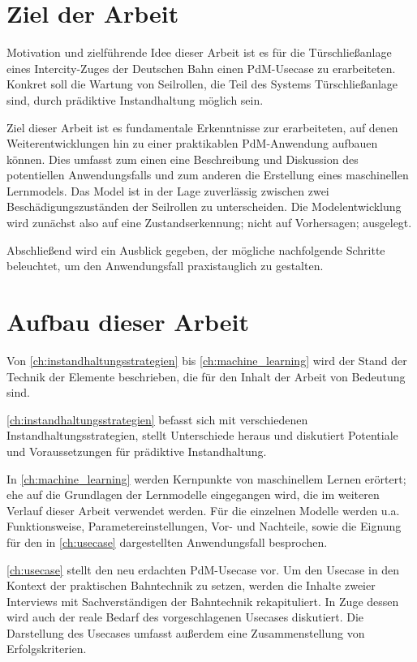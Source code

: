 \section{Ziel der Arbeit}
\label{sec:ziel}
Motivation und zielführende Idee dieser Arbeit ist es für die Türschließanlage eines Intercity-Zuges der Deutschen Bahn einen PdM-Usecase zu erarbeiteten. Konkret soll die Wartung von Seilrollen, die Teil des Systems Türschließanlage sind, durch prädiktive Instandhaltung möglich sein.

Ziel dieser Arbeit ist es fundamentale Erkenntnisse zur erarbeiteten, auf denen Weiterentwicklungen hin zu einer praktikablen PdM-Anwendung aufbauen können. Dies umfasst zum einen eine Beschreibung und Diskussion des potentiellen Anwendungsfalls und zum anderen die Erstellung eines maschinellen Lernmodels. Das Model ist in der Lage zuverlässig zwischen zwei Beschädigungszuständen der Seilrollen zu unterscheiden. Die Modelentwicklung wird zunächst also auf eine Zustandserkennung; nicht auf Vorhersagen; ausgelegt.

Abschließend wird ein Ausblick gegeben, der mögliche nachfolgende Schritte beleuchtet, um den Anwendungsfall praxistauglich zu gestalten.
\section{Aufbau dieser Arbeit}
\label{sec:aufbau_dieser_arbeit}
Von \cref{ch:instandhaltungsstrategien} bis \cref{ch:machine_learning} wird der Stand der Technik der Elemente beschrieben, die für den Inhalt der Arbeit von Bedeutung sind.

\cref{ch:instandhaltungsstrategien} befasst sich mit verschiedenen Instandhaltungsstrategien, stellt Unterschiede heraus und diskutiert Potentiale und Voraussetzungen für prädiktive Instandhaltung.

In \cref{ch:machine_learning} werden Kernpunkte von maschinellem Lernen erörtert; ehe auf die Grundlagen der Lernmodelle eingegangen wird, die im weiteren Verlauf dieser Arbeit verwendet werden. Für die einzelnen Modelle werden u.a. Funktionsweise, Parametereinstellungen, Vor- und Nachteile, sowie die Eignung für den in \cref{ch:usecase} dargestellten Anwendungsfall besprochen. 

\cref{ch:usecase} stellt den neu erdachten PdM-Usecase vor. Um den Usecase in den Kontext der praktischen Bahntechnik zu setzen, werden die Inhalte zweier Interviews mit Sachverständigen der Bahntechnik rekapituliert. In Zuge dessen wird auch der reale Bedarf des vorgeschlagenen Usecases diskutiert. Die Darstellung des Usecases umfasst außerdem eine Zusammenstellung von Erfolgskriterien.

